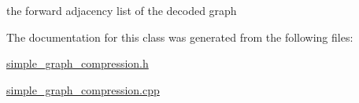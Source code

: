 the forward adjacency list of the decoded graph 



The documentation for this class was generated from the following files\+:\begin{DoxyCompactItemize}
\item 
\hyperlink{simple__graph__compression_8h}{simple\+\_\+graph\+\_\+compression.\+h}\item 
\hyperlink{simple__graph__compression_8cpp}{simple\+\_\+graph\+\_\+compression.\+cpp}\end{DoxyCompactItemize}
